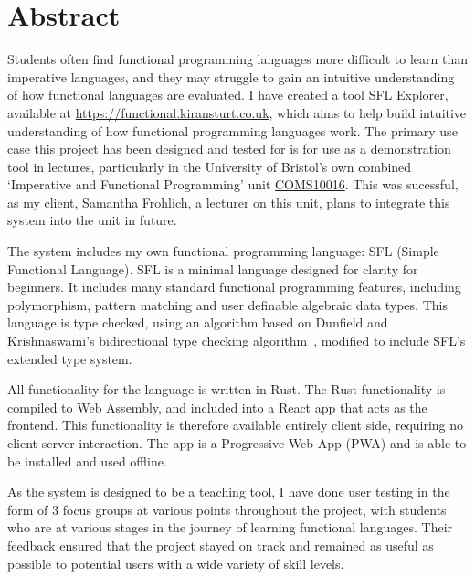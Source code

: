 \chapter*{Abstract}
Students often find functional programming languages more difficult to learn than imperative languages, and they may struggle to gain an intuitive understanding of how functional languages are evaluated. I have created a tool SFL Explorer, available at \href{https://functional.kiransturt.co.uk}{https://functional.kiransturt.co.uk}, which aims to help build intuitive understanding of how functional programming languages work. The primary use case this project has been designed and tested for is for use as a demonstration tool in lectures, particularly in the University of Bristol's own combined `Imperative and Functional Programming' unit \hyperref[COMS10016]{COMS10016}. This was sucessful, as my client, Samantha Frohlich, a lecturer on this unit, plans to integrate this system into the unit in future. 

The system includes my own functional programming language: SFL (Simple Functional Language). SFL is a minimal language designed for clarity for beginners. It includes many standard functional programming features, including polymorphism, pattern matching and user definable algebraic data types. This language is type checked, using an algorithm based on Dunfield and Krishnaswami's bidirectional type checking algorithm~\cite{completebidir}, modified to include SFL's extended type system. 

All functionality for the language is written in Rust. The Rust functionality is compiled to Web Assembly, and included into a React app that acts as the frontend. This functionality is therefore available entirely client side, requiring no client-server interaction. The app is a Progressive Web App (PWA) and is able to be installed and used offline. 

As the system is designed to be a teaching tool, I have done user testing in the form of 3 focus groups at various points throughout the project, with students who are at various stages in the journey of learning functional languages. Their feedback ensured that the project stayed on track and remained as useful as possible to potential users with a wide variety of skill levels. 



